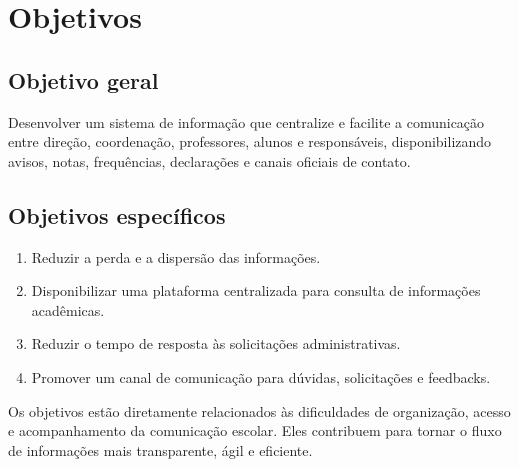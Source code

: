 \section{Objetivos}
\subsection{Objetivo geral}
Desenvolver um sistema de informação que centralize e facilite a comunicação entre direção, coordenação, professores, alunos e responsáveis, disponibilizando avisos, notas, frequências, declarações e canais oficiais de contato.

\subsection{Objetivos específicos}
\begin{enumerate}
\item Reduzir a perda e a dispersão das informações.
\item Disponibilizar uma plataforma centralizada para consulta de informações acadêmicas.
\item Reduzir o tempo de resposta às solicitações administrativas.
\item Promover um canal de comunicação para dúvidas, solicitações e feedbacks.
\end{enumerate}

Os objetivos estão diretamente relacionados às dificuldades de organização, acesso e acompanhamento da comunicação escolar. Eles contribuem para tornar o fluxo de informações mais transparente, ágil e eficiente.
